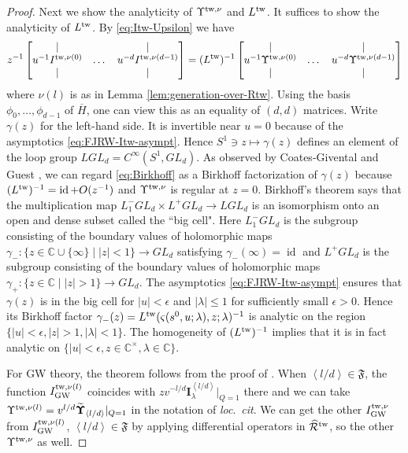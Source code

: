 \documentclass[11pt]{amsart}
\theoremstyle{definition} %
\theoremstyle{remark} %
\newcommand{\CC}{\mathbb C}
\newcommand{\id}{\operatorname{id}}
\newcommand{\tw}{{\rm tw}}
\def\GW{\operatorname{\text{GW}}}
\def\fracp#1{\left\langle #1 \right\rangle}
\newcommand{\cR}{\mathcal{R}}
\newcommand{\hcR}{\widehat{\cR}}
\newcommand{\frF}{\mathfrak{F}}
\renewcommand{\GW}{{\operatorname{GW}}}
\newcommand{\ov}{\overline}
\begin{document}
\begin{proof}
Next we show the analyticity of $\Upsilon^{\tw,\nu}$ 
and $L^{\tw}$. It suffices to show the analyticity of $L^\tw$. 
By \eqref{eq:Itw-Upsilon} we have 
\begin{equation} 
\label{eq:Birkhoff} 
z^{-1} 
\begin{bmatrix}
\vert & & \vert \\  
u^{-1} I^{\tw,\nu(0)}& \dots & u^{-d}I^{\tw,\nu(d-1)} \\ 
\vert & & \vert  
\end{bmatrix} 
= 
(L^\tw)^{-1}
\begin{bmatrix} 
\vert &  & \vert \\ 
u^{-1} \Upsilon^{\tw,\nu(0)} & \dots & u^{-d} \Upsilon^{\tw,\nu(d-1)} \\
\vert &  & \vert 
\end{bmatrix} 
\end{equation} 
where $\nu(l)$ is as in Lemma \ref{lem:generation-over-Rtw}. 
Using the basis $\phi_0,\dots,\phi_{d-1}$ of $\ov{H}$, one can 
view this as an equality of $(d,d)$ matrices. 
Write $\gamma(z)$ for the left-hand side. 
It is invertible near $u=0$ 
because of the asymptotics \eqref{eq:FJRW-Itw-asympt}. 
Hence $S^1 \ni z\mapsto \gamma(z)$ 
defines an element of the loop group $LGL_d=C^\infty(S^1,GL_d)$. 
As observed by Coates-Givental \cite{Coates-Givental} and 
Guest \cite{Guest:D-module}, we can regard \eqref{eq:Birkhoff} 
as a Birkhoff factorization  
of $\gamma(z)$ because $(L^\tw)^{-1} = \id + O(z^{-1})$ and 
$\Upsilon^{\tw,\nu}$ is regular at $z=0$. 
Birkhoff's theorem \cite{Pressley-Segal} says that 
the multiplication map 
$L_1^-GL_d \times L^+ GL_d \to LGL_d$ is an isomorphism onto 
an open and dense subset called the ``big cell". 
Here $L_1^- GL_d$ is the subgroup consisting of the boundary values of 
holomorphic maps $\gamma_- \colon 
\{z\in \CC\cup \{\infty\} \mid |z|< 1\} \to GL_d$ 
satisfying $\gamma_-(\infty) =\id$ and 
$L^+GL_d$ is the subgroup consisting of the boundary values of 
holomorphic maps $\gamma_+ \colon 
\{z\in \CC \mid |z|>1\} \to GL_d$. 
The asymptotics \eqref{eq:FJRW-Itw-asympt} 
ensures that $\gamma(z)$ is in the big cell for 
$|u|<\epsilon$ and $|\lambda|\le 1$ for sufficiently 
small $\epsilon>0$. 
Hence its Birkhoff factor $\gamma_-(z) =
L^{\tw}(\varsigma(s^0,u;\lambda),z;\lambda)^{-1}$ 
is analytic on the region $\{|u|<\epsilon, |z|> 1, |\lambda|<1\}$.  
The homogeneity of $(L^\tw)^{-1}$ implies that 
it is in fact analytic on $\{|u|<\epsilon, z\in \CC^\times, 
\lambda\in \CC\}$. 


For GW theory, the theorem 
follows from the proof of \cite[Theorem 4.6]{Iritani:period}. 
When $\fracp{l/d} \in \frF$, 
the function $I^{\tw,\nu(l)}_{\GW}$ coincides with 
$z v^{-l/d} {\mathbf I}_\lambda^{\fracp{l/d}}|_{Q=1}$ there 
and we can take $\Upsilon^{\tw,\nu(l)} = v^{l/d} 
\widetilde{\mathbf \Upsilon}_{\fracp{l/d}}|_{Q=1}$ 
in the notation of \emph{loc}.\ \emph{cit}. 
We can get the other $I^{\tw,\nu}_{\GW}$ 
from $I^{\tw,\nu(l)}_{\GW}$, $\fracp{l/d}\in \frF$ 
by applying differential operators in $\hcR^\tw$, 
so the other $\Upsilon^{\tw,\nu}$ as well. 
\end{proof} 
\end{document}

